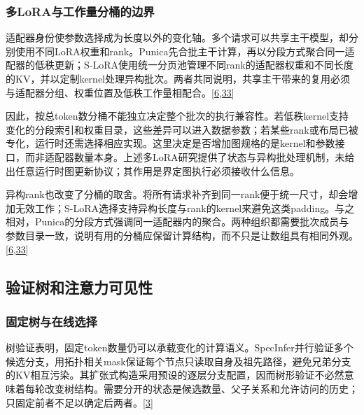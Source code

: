 \documentclass[
  UTF8,
  zihao=5]{ctexart}
\begin{document}
\hypertarget{ux591aloraux4e0eux5de5ux4f5cux91cfux5206ux6876ux7684ux8fb9ux754c}{%
\subsubsection{多LoRA与工作量分桶的边界}\label{ux591aloraux4e0eux5de5ux4f5cux91cfux5206ux6876ux7684ux8fb9ux754c}}

适配器身份使参数选择成为长度以外的变化轴。多个请求可以共享主干模型，却分别使用不同LoRA权重和rank。Punica先合批主干计算，再以分段方式聚合同一适配器的低秩更新；S-LoRA使用统一分页池管理不同rank的适配器权重和不同长度的KV，并以定制kernel处理异构批次。两者共同说明，共享主干带来的复用必须与适配器分组、权重位置及低秩工作量相配合。{[}\protect\hyperlink{ref-sheng2024slora}{6},\protect\hyperlink{ref-chen2024punica}{33}{]}

因此，按总token数分桶不能独立决定整个批次的执行兼容性。若低秩kernel支持变化的分段索引和权重目录，这些差异可以进入数据参数；若某些rank或布局已被专化，运行时还需选择相应实现。这里决定是否增加图规格的是kernel和参数接口，而非适配器数量本身。上述多LoRA研究提供了状态与异构批处理机制，未给出任意运行时图更新协议；其作用是界定图执行必须接收什么信息。

异构rank也改变了分桶的取舍。将所有请求补齐到同一rank便于统一尺寸，却会增加无效工作；S-LoRA选择支持异构长度与rank的kernel来避免这类padding。与之相对，Punica的分段方式强调同一适配器内的聚合。两种组织都需要批次成员与参数目录一致，说明有用的分桶应保留计算结构，而不只是让数组具有相同外观。{[}\protect\hyperlink{ref-sheng2024slora}{6},\protect\hyperlink{ref-chen2024punica}{33}{]}

\hypertarget{ux9a8cux8bc1ux6811ux548cux6ce8ux610fux529bux53efux89c1ux6027}{%
\subsection{验证树和注意力可见性}\label{ux9a8cux8bc1ux6811ux548cux6ce8ux610fux529bux53efux89c1ux6027}}

\hypertarget{ux56faux5b9aux6811ux4e0eux5728ux7ebfux9009ux62e9}{%
\subsubsection{固定树与在线选择}\label{ux56faux5b9aux6811ux4e0eux5728ux7ebfux9009ux62e9}}

树验证表明，固定token数量仍可以承载变化的计算语义。SpecInfer并行验证多个候选分支，用拓扑相关mask保证每个节点只读取自身及祖先路径，避免兄弟分支的KV相互污染。其扩张式构造采用预设的逐层分支配置，因而树形验证不必然意味着每轮改变树结构。需要分开的状态是候选数量、父子关系和允许访问的历史；只固定前者不足以确定后两者。{[}\protect\hyperlink{ref-miao2024specinfer}{3}{]}
\end{document}
